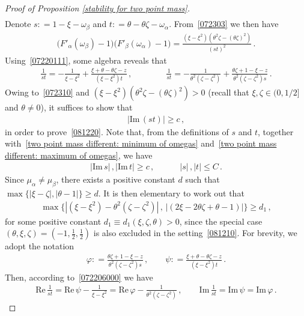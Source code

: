 \documentclass[10pt,reqno]{amsart}
\numberwithin{equation}{section}
\theoremstyle{plain}
\numberwithin{kevin}{section}
\theoremstyle{remark}
\renewcommand{\Re}{\mathrm{Re}\,}
\renewcommand{\Im}{\mathrm{Im}\,}
\newcommand{\deq}{\mathrel{\mathop:}=}
\begin{document}
\begin{proof}[Proof of Proposition \ref{stability for two point mass}]
\begin{align}
\end{align}
Denote $s\deq 1-\xi-\omega_\beta$ and $ t\deq\theta-\theta \zeta-\omega_\alpha$. 
From~\eqref{072303} we then have
\begin{align}
\big(F'_\alpha(\omega_\beta)-1\big)\big( F'_\beta(\omega_\alpha)-1\big)=\frac{(\xi-\xi^2)(\theta^2\zeta-(\theta \zeta)^2)}{(st)^2}\,. \label{072360}
\end{align}
Using~\eqref{07220111}, some algebra reveals that
\begin{align}
\frac{1}{st}=-\frac{1}{\xi-\xi^2}+\frac{\xi+\theta-\theta \zeta-z}{(\xi-\xi^2)t}\,, \qquad\qquad  \frac{1}{st}=-\frac{1}{\theta^2(\zeta-\zeta^2)}+\frac{\theta \zeta+1-\xi-z}{\theta^2(\zeta-\zeta^2)s}\,.\label{072206000}
\end{align}
Owing to~\eqref{072310} and $(\xi-\xi^2)(\theta^2\zeta-(\theta \zeta)^2)>0$ (recall that $\xi,\zeta\in(0,1/2]$ and $\theta\not=0$), it suffices to show that
\begin{align}
|\Im(st)|\geq c\,, \label{072205000}
\end{align}
in order to prove~\eqref{081220}. Note that, from the definitions of $s$ and $t$, together with~\eqref{two point mass different: minimum of omegas} and~\eqref{two point mass different: maximum of omegas}, we have
\begin{align}
|\Im s|\,, |\Im t|\geq c\,,\qquad\quad |s|\,, |t|\leq C\,. \label{080502}
\end{align}
Since $\mu_{\alpha}\neq \mu_{\beta}$, there exists a positive constant $d$ such that $\max\{|\xi-\zeta|,|\theta-1|\}\geq d$. It is then elementary to work out that
\begin{align}
\max \{|(\xi-\xi^2)-\theta^2(\zeta-\zeta^2)|\,,\,|(2\xi-2\theta \zeta+\theta-1)|\}\geq d_1\,, \label{081750}
\end{align}
for some positive constant $d_1\equiv d_1(\xi,\zeta,\theta)>0$, since the special case $(\theta,\xi,\zeta)=(-1,\frac12,\frac12)$ is also excluded in the setting~\eqref{081210}. For brevity, we adopt the notation
\begin{align*}
\varphi\deq\frac{\theta \zeta+1-\xi-z}{\theta^2(\zeta-\zeta^2)s}\,,\qquad \psi\deq\frac{\xi+\theta-\theta \zeta-z}{(\xi-\xi^2)t}\,.
\end{align*}
Then, according to~\eqref{072206000} we have
\begin{align}
\Re\frac{1}{st}=\Re \psi-\frac{1}{\xi-\xi^2}=\Re \varphi-\frac{1}{\theta^2(\zeta-\zeta^2)}\,,\qquad \Im \frac{1}{st}=\Im \psi=\Im \varphi\,. \label{081050}
\end{align}

\end{proof}
\end{document}

